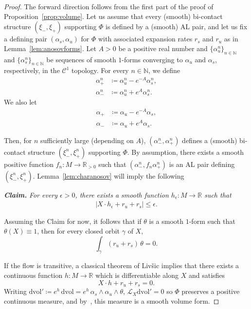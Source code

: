 \documentclass[letterpaper, 11pt]{article}
\numberwithin{equation}{section}
\newcommand{\N}{\mathbb{N}}
\newcommand{\R}{\mathbb{R}}
\begin{document}
\begin{proof}
The forward direction follows from the first part of the proof of Proposition~\ref{prop:volume}. Let us assume that every (smooth) bi-contact structure $(\xi_-, \xi_+)$ supporting $\Phi$ is defined by a (smooth) AL pair, and let us fix a defining pair $(\alpha_s, \alpha_u)$ for $\Phi$ with associated expansion rates $r_s$ and $r_u$ as in Lemma~\ref{lem:anosovforms}. Let $A>0$ be a positive real number and $\{\alpha^n_u\}_{n \in \N}$ and $\{\alpha^n_s\}_{n\in \N}$ be sequences of smooth $1$-forms converging to $\alpha_u$ and $\alpha_s$, respectively, in the $\mathcal{C}^1$ topology. For every $n \in \N$, we define
\begin{align*}
    \alpha^n_+ &\coloneqq \alpha^n_u - e^{-A} \alpha^n_s, \\
    \alpha^n_- &\coloneqq \alpha^n_u + e^A \alpha^n_s.
\end{align*}
We also let
\begin{align*}
    \alpha_+ &\coloneqq \alpha_u - e^{-A} \alpha_s, \\
    \alpha_- &\coloneqq \alpha_u + e^A \alpha_s.
\end{align*}

Then, for $n$ sufficiently large (depending on $A$), $(\alpha^n_-, \alpha^n_+)$ defines a (smooth) bi-contact structure $(\xi^n_-, \xi^n_+)$ supporting $\Phi$. By assumption, there exists a smooth positive function $f_n : M \rightarrow \R_{>0}$ such that $(\alpha^n_-, f_n \alpha^n_+)$ is an AL pair defining $(\xi^n_-, \xi^n_+)$. Lemma~\ref{lem:charanosov}  will imply the following

\medskip

\textbf{\textit{Claim.}} \textit{For every $\epsilon > 0$, there exists a smooth function $h_\epsilon : M \rightarrow \R$ such that}
\begin{align}
\vert X \cdot h_\epsilon + r_u + r_s \vert \leq \epsilon. \label{eq:cond}
\end{align}

\medskip

Assuming the Claim for now, it follows that if $\theta$ is a smooth $1$-form such that $\theta(X)\equiv 1$, then for every closed orbit $\gamma$ of $X$, $$\int_\gamma (r_u+r_s) \, \theta = 0.$$

If the flow is transitive, a classical theorem of Liv\v{s}ic implies that there exists a continuous function $h :M \rightarrow \R$ which is differentiable along $X$ and satisfies $$X \cdot h +r_u +r_s = 0.$$ Writing $\mathrm{dvol}' \coloneqq e^h \, \mathrm{dvol} = e^h \, \alpha_s \wedge \alpha_u \wedge \theta$, $\mathcal{L}_X \mathrm{dvol}' = 0$ so $\Phi$ preserves a positive continuous measure, and by~\cite[Corollary 2.1]{LMM}, this measure is a smooth volume form.


\end{proof}
\end{document}
